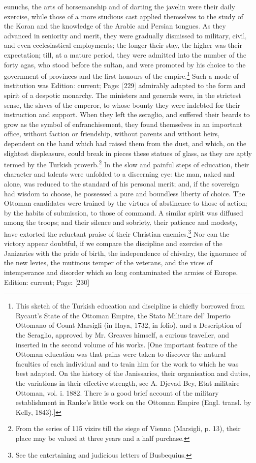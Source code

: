 eunuchs, the arts of horsemanship and of darting the javelin were their daily exercise, while those of a more studious cast applied themselves to the study of the Koran and the knowledge of the Arabic and Persian tongues. As they advanced in seniority and merit, they were gradually dismissed to military, civil, and even ecclesiastical employments; the longer their stay, the higher was their expectation; till, at a mature period, they were admitted into the number of the forty agas, who stood before the sultan, and were promoted by his choice to the government of provinces and the first honours of the empire.\footnote{This sketch of the Turkish education and discipline is chiefly borrowed from Rycaut\texthebrew{}’s State of the Ottoman Empire, the Stato Militare del\texthebrew{}’ Imperio Ottomano of Count Marsigli (in Haya, 1732, in folio), and a Description of the Seraglio, approved by Mr. Greaves himself, a curious traveller, and inserted in the second volume of his works. [One important feature of the Ottoman education was that pains were taken to discover the natural faculties of each individual and to train him for the work to which he was best adapted. On the history of the Janissaries, their organisation and duties, the variations in their effective strength, see A. Djevad Bey, Etat militaire Ottoman, vol. i. 1882. There is a good brief account of the military establishment in Ranke\texthebrew{}’s little work on the Ottoman Empire (Engl. transl. by Kelly, 1843).]} Such a mode of institution was Edition: current; Page: [229] admirably adapted to the form and spirit of a despotic monarchy. The ministers and generals were, in the strictest sense, the slaves of the emperor, to whose bounty they were indebted for their instruction and support. When they left the seraglio, and suffered their beards to grow as the symbol of enfranchisement, they found themselves in an important office, without faction or friendship, without parents and without heirs, dependent on the hand which had raised them from the dust, and which, on the slightest displeasure, could break in pieces these statues of glass, as they are aptly termed by the Turkish proverb.\footnote{From the series of 115 vizirs till the siege of Vienna (Marsigli, p. 13), their place may be valued at three years and a half purchase.} In the slow and painful steps of education, their character and talents were unfolded to a discerning eye: the man, naked and alone, was reduced to the standard of his personal merit; and, if the sovereign had wisdom to choose, he possessed a pure and boundless liberty of choice. The Ottoman candidates were trained by the virtues of abstinence to those of action; by the habits of submission, to those of command. A similar spirit was diffused among the troops; and their silence and sobriety, their patience and modesty, have extorted the reluctant praise of their Christian enemies.\footnote{See the entertaining and judicious letters of Busbequius.} Nor can the victory appear doubtful, if we compare the discipline and exercise of the Janizaries with the pride of birth, the independence of chivalry, the ignorance of the new levies, the mutinous temper of the veterans, and the vices of intemperance and disorder which so long contaminated the armies of Europe.
Edition: current; Page: [230]

